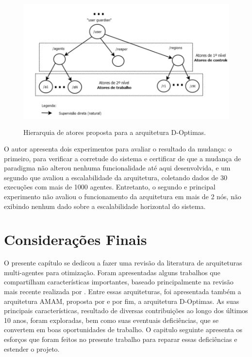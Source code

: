 \begin{figure}
    \centering
    \caption{Hierarquia de atores proposta para a arquitetura D-Optimas.}
    \includegraphics[scale=0.4]{imagens/d-optimas-pacheco.png}
    \label{fig:d_optimas_pacheco}
\end{figure}

O autor apresenta dois experimentos para avaliar o resultado da mudança: o primeiro, para verificar a corretude do sistema e certificar de que a mudança de paradigma não alterou nenhuma funcionalidade até aqui desenvolvida, e um segundo que avaliou a escalabilidade da arquitetura, coletando dados de 30 execuções com mais de 1000 agentes. Entretanto, o segundo e principal experimento não avaliou o funcionamento da arquitetura em mais de 2 nós, não exibindo nenhum dado sobre a escalabilidade horizontal do sistema.

\section{Considerações Finais}
O presente capítulo se dedicou a fazer uma revisão da literatura de arquiteturas multi-agentes para otimização. Foram apresentadas alguns trabalhos que compartilham características importantes, baseado principalmente na revisão mais recente realizada por . Entre essas arquiteturas, foi apresentada também a arquitetura AMAM, proposta por  e por fim, a arquitetura D-Optimas. As suas principais características, resultado de diversas contribuições ao longo dos últimos 10 anos, foram exploradas, bem como suas eventuais deficiências, que se convertem em boas oportunidades de trabalho. O capitulo seguinte apresenta os esforços que foram feitos no presente trabalho para reparar essas deficiências e estender o projeto. 